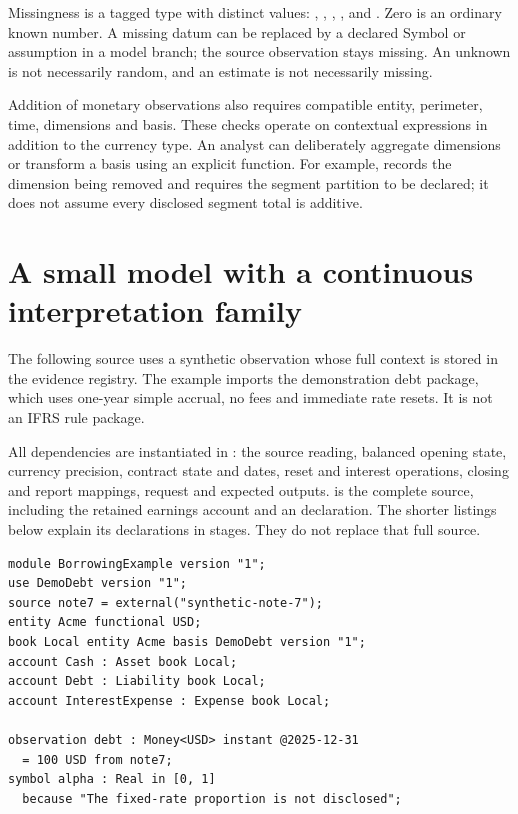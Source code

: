 Missingness is a tagged type with distinct values: ,
, , , and
. Zero is an ordinary known number. A missing datum can
be replaced by a declared Symbol or assumption in a model branch; the source
observation stays missing. An unknown is not necessarily random, and an
estimate is not necessarily missing.

Addition of monetary observations also requires compatible entity, perimeter,
time, dimensions and basis. These checks operate on contextual expressions in
addition to the currency type. An analyst can deliberately aggregate dimensions
or transform a basis using an explicit function. For example,
 records the dimension being removed and requires
the segment partition to be declared; it does not assume every disclosed
segment total is additive.


\section{A small model with a continuous interpretation family}

The following source uses a synthetic observation whose full context is stored
in the evidence registry. The example imports the demonstration debt package,
which uses one-year simple accrual, no fees and immediate rate resets. It is
not an IFRS rule package.

All dependencies are instantiated in
: the source reading, balanced opening
state, currency precision, contract state and dates, reset and interest
operations, closing and report mappings, request and expected outputs.
 is the complete source, including the retained
earnings account and an  declaration. The shorter listings below
explain its declarations in stages. They do not replace that full source.

\begin{lstlisting}
module BorrowingExample version "1";
use DemoDebt version "1";
source note7 = external("synthetic-note-7");
entity Acme functional USD;
book Local entity Acme basis DemoDebt version "1";
account Cash : Asset book Local;
account Debt : Liability book Local;
account InterestExpense : Expense book Local;

observation debt : Money<USD> instant @2025-12-31
  = 100 USD from note7;
symbol alpha : Real in [0, 1]
  because "The fixed-rate proportion is not disclosed";
\end{lstlisting}

